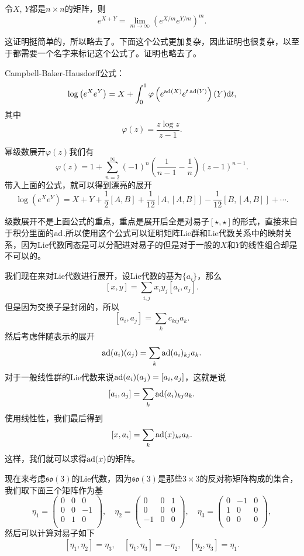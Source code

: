 \pro
令$X$, $Y$都是$n\times n$的矩阵，则
\[
	e^{X+Y}=\lim_{m\to\infty}\left(e^{X/m}e^{Y/m}\right)^m.
\]

这证明挺简单的，所以略去了。下面这个公式更加复杂，因此证明也很复杂，以至于都需要一个名字来标记这个公式了。证明也略去了。

\theo Campbell-Baker-Hausdorff公式：
\[
\log\left(e^Xe^Y\right)=X+\int_0^1 \varphi\left(e^{\operatorname{ad}(X)}e^{t\operatorname{ad}(Y)}\right)(Y)\mathrm{d} t,
\]
其中
\[
\varphi(z)=\frac{z\log z}{z-1}.
\]

幂级数展开$\varphi(z)$我们有
\[
	\varphi(z)=1+\sum_{n=2}^\infty (-1)^n\left(\frac{1}{n-1}-\frac{1}{n}\right)(z-1)^{n-1}.
\]
带入上面的公式，就可以得到漂亮的展开
\[
\log\left(e^Xe^Y\right)=X+Y+\frac{1}{2}[A,B]+\frac{1}{12}[A,[A,B]]-\frac{1}{12}[B,[A,B]]+\cdots.
\]

级数展开不是上面公式的重点，重点是展开后全是对易子$[\star,\star]$的形式，直接来自于积分里面的$\operatorname{ad}$.所以使用这个公式可以证明矩阵Lie群和Lie代数关系中的映射关系，因为Lie代数同态是可以分配进对易子的但是对于一般的$X$和$Y$的线性组合却是不可以的。

我们现在来对Lie代数进行展开，设Lie代数的基为$\{a_i\}$，那么
\[
	[x,y]=\sum_{i,j}x_iy_j[a_i,a_j].
\]
但是因为交换子是封闭的，所以
\[
	[a_i,a_j]=\sum_k c_{kij}a_k.
\]
然后考虑伴随表示的展开
\[
	\operatorname{ad}(a_i)(a_j)=\sum_k \operatorname{ad}(a_i)_{kj}a_k.
\]
对于一般线性群的Lie代数来说$\operatorname{ad}(a_i)(a_j)=[a_i,a_j]$，这就是说
\[
	[a_i,a_j]=\sum_k \operatorname{ad}(a_i)_{kj}a_k.
\]
使用线性性，我们最后得到
\[
	[x,a_i]=\sum_k \operatorname{ad}(x)_{ki}a_k.
\]
这样，我们就可以求得$\operatorname{ad}(x)$的矩阵。

现在来考虑$\mathfrak{so}(3)$的Lie代数，因为$\mathfrak{so}(3)$是那些$3\times 3$的反对称矩阵构成的集合，我们取下面三个矩阵作为基
\[
	\eta_1=
		\begin{pmatrix}
			0&0&0\\
			0&0&-1\\
			0&1&0\\
		\end{pmatrix},\quad
	\eta_2=
		\begin{pmatrix}
			0&0&1\\
			0&0&0\\
			-1&0&0\\
		\end{pmatrix},\quad
	\eta_3=
		\begin{pmatrix}
			0&-1&0\\
			1&0&0\\
			0&0&0\\
		\end{pmatrix},
\]
然后可以计算对易子如下
\[
	[\eta_1,\eta_2]=\eta_3,\quad [\eta_1,\eta_3]=-\eta_2,\quad [\eta_2,\eta_3]=\eta_1.
\]

